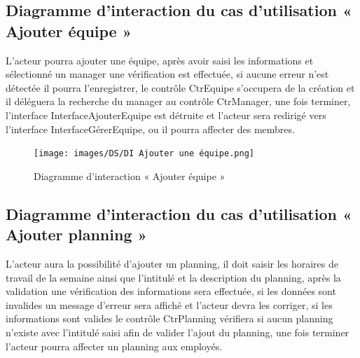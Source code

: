 \subsection*{Diagramme d'interaction du cas d'utilisation « Ajouter équipe »}
L’acteur pourra ajouter une équipe, après avoir saisi les informations et 
sélectionné un manager une vérification est effectuée, si aucune erreur n’est 
détectée il pourra l’enregistrer, le contrôle CtrEquipe s’occupera de la 
création et il déléguera la recherche du manager au contrôle CtrManager, une 
fois terminer, l’interface InterfaceAjouterEquipe est détruite et l’acteur sera 
redirigé vers l’interface InterfaceGérerEquipe, ou il pourra affecter 
des membres.

\clearpage

\begin{figure}[h!]
    \centering
    \texttt{[image: images/DS/DI Ajouter une équipe.png]}
    \caption{Diagramme d'interaction « Ajouter équipe »}
    \label{fig38}
\end{figure}
        

\subsection*{Diagramme d'interaction du cas d'utilisation « Ajouter planning »}
L’acteur aura la possibilité d’ajouter un planning, il doit saisir les horaires
de travail de la semaine ainsi que l’intitulé et la description du planning, 
après la validation une vérification des informations sera effectuée, si les 
données sont invalides un message d’erreur sera affiché et l’acteur devra les 
corriger, si les informations sont valides le contrôle CtrPlanning vérifiera si 
aucun planning n’existe avec l’intitulé saisi afin de valider l’ajout du 
planning, une fois terminer l’acteur pourra affecter un planning aux employés.

\clearpage

